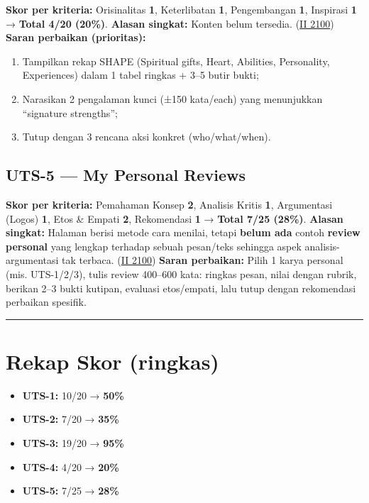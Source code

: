 \documentclass[
  letterpaper,
  DIV=11,
  numbers=noendperiod]{scrreprt}
\providecommand{\tightlist}{%
  \setlength{\itemsep}{0pt}\setlength{\parskip}{0pt}}\usepackage{longtable,booktabs,array}
\begin{document}
\textbf{Skor per kriteria:} Orisinalitas \textbf{1}, Keterlibatan
\textbf{1}, Pengembangan \textbf{1}, Inspirasi \textbf{1} →
\textbf{Total 4/20 (20\%)}. \textbf{Alasan singkat:} Konten belum
tersedia.
(\href{https://ii-2100.github.io/all-about-me/My_Shapes/index.html}{II
2100}) \textbf{Saran perbaikan (prioritas):}

\begin{enumerate}
\def\labelenumi{\arabic{enumi}.}
\tightlist
\item
  Tampilkan rekap SHAPE (Spiritual gifts, Heart, Abilities, Personality,
  Experiences) dalam 1 tabel ringkas + 3--5 butir bukti;
\item
  Narasikan 2 pengalaman kunci (±150 kata/each) yang menunjukkan
  ``signature strengths'';
\item
  Tutup dengan 3 rencana aksi konkret (who/what/when).
\end{enumerate}

\subsection{UTS-5 --- My Personal
Reviews}\label{uts-5-my-personal-reviews-1}

\textbf{Skor per kriteria:} Pemahaman Konsep \textbf{2}, Analisis Kritis
\textbf{1}, Argumentasi (Logos) \textbf{1}, Etos \& Empati \textbf{2},
Rekomendasi \textbf{1} → \textbf{Total 7/25 (28\%)}. \textbf{Alasan
singkat:} Halaman berisi metode cara menilai, tetapi \textbf{belum ada}
contoh \textbf{review personal} yang lengkap terhadap sebuah pesan/teks
sehingga aspek analisis-argumentasi tak terbaca.
(\href{https://ii-2100.github.io/all-about-me/My_Personal_Reviews/index.html}{II
2100}) \textbf{Saran perbaikan:} Pilih 1 karya personal (mis.
UTS-1/2/3), tulis review 400--600 kata: ringkas pesan, nilai dengan
rubrik, berikan 2--3 bukti kutipan, evaluasi etos/empati, lalu tutup
dengan rekomendasi perbaikan spesifik.

\begin{center}\rule{0.5\linewidth}{0.5pt}\end{center}

\section{Rekap Skor (ringkas)}\label{rekap-skor-ringkas}

\begin{itemize}
\tightlist
\item
  \textbf{UTS-1:} 10/20 → \textbf{50\%}
\item
  \textbf{UTS-2:} 7/20 → \textbf{35\%}
\item
  \textbf{UTS-3:} 19/20 → \textbf{95\%}
\item
  \textbf{UTS-4:} 4/20 → \textbf{20\%}
\item
  \textbf{UTS-5:} 7/25 → \textbf{28\%}
\end{itemize}
\end{document}
